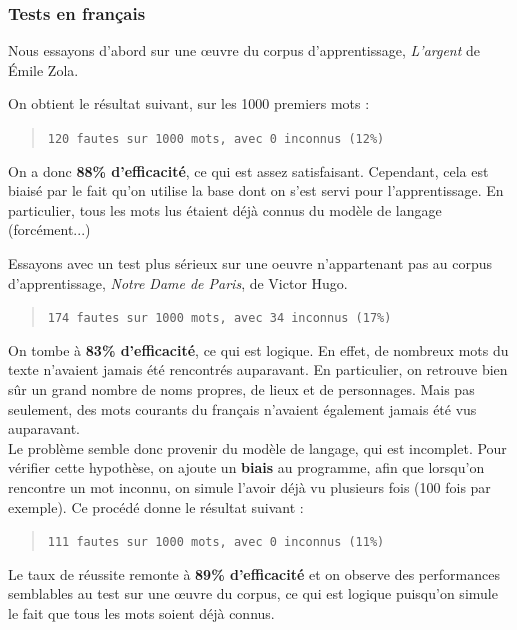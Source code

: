 \documentclass[10pt,a4paper]{article}
\begin{document}
\subsubsection{Tests en français}

Nous essayons d'abord sur une œuvre du corpus d'apprentissage, \textit{L'argent} de Émile Zola.

On obtient le résultat suivant, sur les 1000 premiers mots : 

\begin{quote} 
\centering 
\verb!120 fautes sur 1000 mots, avec 0 inconnus (12%)!
\end{quote}

On a donc \textbf{88\% d'efficacité}, ce qui est assez satisfaisant. Cependant, cela est biaisé par le fait qu'on utilise la base dont on s'est servi pour l'apprentissage. En particulier, tous les mots lus étaient déjà connus du modèle de langage (forcément...)

Essayons avec un test plus sérieux sur une oeuvre n'appartenant pas au corpus d'apprentissage, \textit{Notre Dame de Paris}, de Victor Hugo.

\begin{quote} 
\centering 
\verb!174 fautes sur 1000 mots, avec 34 inconnus (17%)!
\end{quote}

On tombe à \textbf{83\% d'efficacité}, ce qui est logique. En effet, de nombreux mots du texte n'avaient jamais été rencontrés auparavant. En particulier, on retrouve bien sûr un grand nombre de noms propres, de lieux et de personnages. Mais pas seulement, des mots courants du français n'avaient également jamais été vus auparavant.\\

Le problème semble donc provenir du modèle de langage, qui est incomplet. Pour vérifier cette hypothèse, on ajoute un \textbf{biais} au programme, afin que lorsqu'on rencontre un mot inconnu, on simule l'avoir déjà vu plusieurs fois (100 fois par exemple). Ce procédé donne le résultat suivant : 

\begin{quote} 
\centering 
\verb!111 fautes sur 1000 mots, avec 0 inconnus (11%)!
\end{quote}

Le taux de réussite remonte à \textbf{89\% d'efficacité} et on observe des performances semblables au test sur une œuvre du corpus, ce qui est logique puisqu'on simule le fait que tous les mots soient déjà connus.
\end{document}
